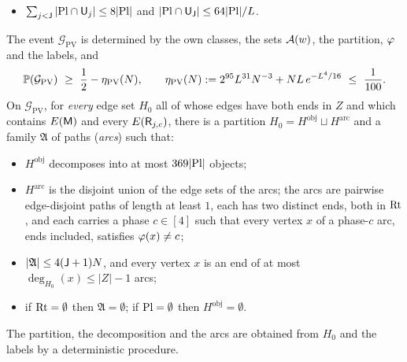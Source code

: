 \begin{lemma}
\begin{itemize}
  elements;
\item[(G5)] $\sum_{j<\mathsf{J}}|\mathrm{Pl}\cap\mathsf{U}_j|\le8|\mathrm{Pl}|$ and $|\mathrm{Pl}\cap\mathsf{U}_{\mathsf{J}}|\le64|\mathrm{Pl}|/L$.
\end{itemize}
The event $\mathcal G_{\mathrm{PV}}$ is determined by the own classes, the sets $\mathcal{A}(w)$, the partition, $\varphi$ and
the labels, and
\begin{equation}\label{s4:eqPVprob}
\Prob(\mathcal G_{\mathrm{PV}})\ \ge\ \frac12-\eta_{\mathrm{PV}}(N),\qquad
\eta_{\mathrm{PV}}(N):=2^{95}L^{31}N^{-3}+NL\,e^{-L^4/16}\ \le\ \frac1{100}.
\end{equation}
On $\mathcal G_{\mathrm{PV}}$, for \emph{every} edge set $H_0$ all of whose edges have both ends in $Z$ and which
contains $E(\mathsf{M})$ and every $E(\mathsf{R}_{j,c})$, there is a partition $H_0=H^{\mathrm{obj}}\sqcup H^{\mathrm{arc}}$ and a
family $\mathfrak A$ of paths (\emph{arcs}) such that:
\begin{itemize}
\item[(a)] $H^{\mathrm{obj}}$ decomposes into at most $369|\mathrm{Pl}|$ objects;
\item[(b)] $H^{\mathrm{arc}}$ is the disjoint union of the edge sets of the arcs; the arcs are pairwise edge-disjoint
  paths of length at least $1$, each has two distinct ends, both in $\mathrm{Rt}$, and each carries a phase $c\in[4]$ such
  that every vertex $x$ of a phase-$c$ arc, ends included, satisfies $\varphi(x)\ne c$;
\item[(c)] $|\mathfrak A|\le4(\mathsf{J}+1)N$, and every vertex $x$ is an end of at most $\deg_{H_0}(x)\le|Z|-1$ arcs;
\item[(d)] if $\mathrm{Rt}=\emptyset$ then $\mathfrak A=\emptyset$; if $\mathrm{Pl}=\emptyset$ then $H^{\mathrm{obj}}=\emptyset$.
\end{itemize}
The partition, the decomposition and the arcs are obtained from $H_0$ and the labels by a deterministic procedure.
\end{lemma}

